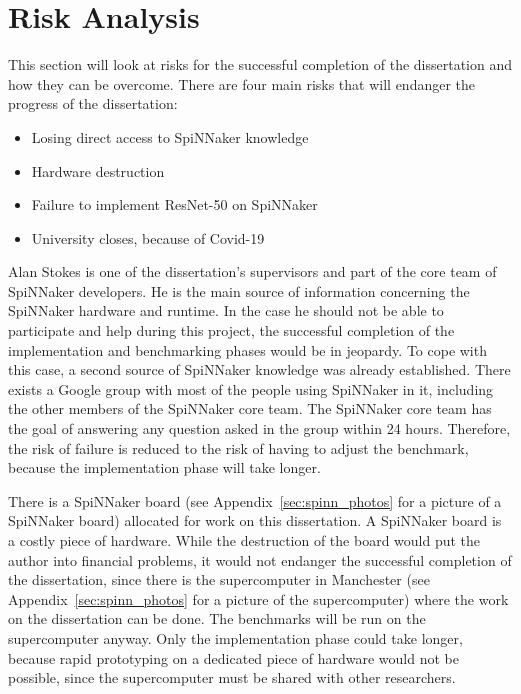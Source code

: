 \documentclass{article}
\begin{document}

\section{Risk Analysis} %
\label{sec:risk_analysis}

This section will look at risks for the successful
completion of the dissertation and how they can be
overcome.
There are four main risks that will endanger the progress
of the dissertation:
\begin{itemize}
  \item Losing direct access to SpiNNaker knowledge
  \item Hardware destruction
  \item Failure to implement ResNet-50 on SpiNNaker
  \item University closes, because of Covid-19
\end{itemize}

Alan Stokes is one of the dissertation's supervisors and part
of the core team of SpiNNaker developers.
He is the main source of information concerning the
SpiNNaker hardware and runtime.
In the case he should not be able to participate and help
during this project, the successful completion of the implementation
and benchmarking phases would be in jeopardy.
To cope with this case, a second source of SpiNNaker knowledge was
already established.
There exists a Google group with most of the people using SpiNNaker in
it, including the other members of the SpiNNaker core team.
The SpiNNaker core team has the goal of answering any question asked
in the group within 24 hours.
Therefore, the risk of failure is reduced to the risk of having to
adjust the benchmark, because the implementation phase will take
longer.

There is a SpiNNaker board (see
Appendix~\ref{sec:spinn_photos} for a picture of a
SpiNNaker board) allocated for work on this dissertation.
A SpiNNaker board is a costly piece of hardware.
While the destruction of the board would put the author
into financial problems, it would not endanger the
successful completion of the dissertation, since there is
the supercomputer in Manchester (see
Appendix~\ref{sec:spinn_photos} for a picture of the
supercomputer) where the work on the dissertation can be
done.
The benchmarks will be run on the supercomputer anyway.
Only the implementation phase could take longer, because
rapid prototyping on a dedicated piece of hardware would
not be possible, since the supercomputer must be shared
with other researchers.
\end{document}
